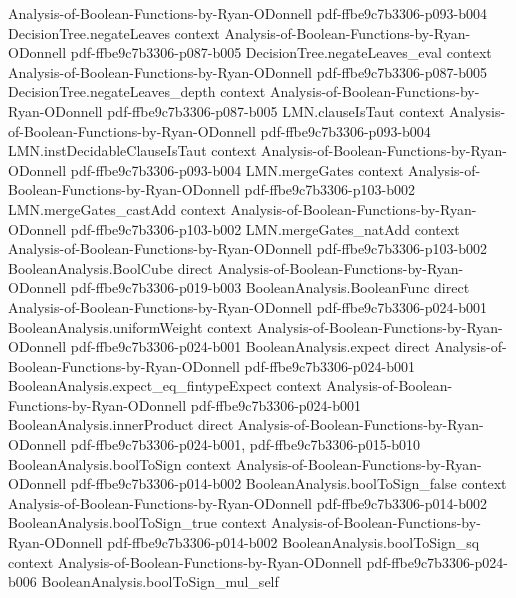 \begin{theorem}
  {Analysis-of-Boolean-Functions-by-Ryan-ODonnell}
  {pdf-ffbe9c7b3306-p093-b004}
\proofstep
  {DecisionTree.negateLeaves}
  {context}
  {Analysis-of-Boolean-Functions-by-Ryan-ODonnell}
  {pdf-ffbe9c7b3306-p087-b005}
\proofstep
  {DecisionTree.negateLeaves_eval}
  {context}
  {Analysis-of-Boolean-Functions-by-Ryan-ODonnell}
  {pdf-ffbe9c7b3306-p087-b005}
\proofstep
  {DecisionTree.negateLeaves_depth}
  {context}
  {Analysis-of-Boolean-Functions-by-Ryan-ODonnell}
  {pdf-ffbe9c7b3306-p087-b005}
\proofstep
  {LMN.clauseIsTaut}
  {context}
  {Analysis-of-Boolean-Functions-by-Ryan-ODonnell}
  {pdf-ffbe9c7b3306-p093-b004}
\proofstep
  {LMN.instDecidableClauseIsTaut}
  {context}
  {Analysis-of-Boolean-Functions-by-Ryan-ODonnell}
  {pdf-ffbe9c7b3306-p093-b004}
\proofstep
  {LMN.mergeGates}
  {context}
  {Analysis-of-Boolean-Functions-by-Ryan-ODonnell}
  {pdf-ffbe9c7b3306-p103-b002}
\proofstep
  {LMN.mergeGates_castAdd}
  {context}
  {Analysis-of-Boolean-Functions-by-Ryan-ODonnell}
  {pdf-ffbe9c7b3306-p103-b002}
\proofstep
  {LMN.mergeGates_natAdd}
  {context}
  {Analysis-of-Boolean-Functions-by-Ryan-ODonnell}
  {pdf-ffbe9c7b3306-p103-b002}
\proofstep
  {BooleanAnalysis.BoolCube}
  {direct}
  {Analysis-of-Boolean-Functions-by-Ryan-ODonnell}
  {pdf-ffbe9c7b3306-p019-b003}
\proofstep
  {BooleanAnalysis.BooleanFunc}
  {direct}
  {Analysis-of-Boolean-Functions-by-Ryan-ODonnell}
  {pdf-ffbe9c7b3306-p024-b001}
\proofstep
  {BooleanAnalysis.uniformWeight}
  {context}
  {Analysis-of-Boolean-Functions-by-Ryan-ODonnell}
  {pdf-ffbe9c7b3306-p024-b001}
\proofstep
  {BooleanAnalysis.expect}
  {direct}
  {Analysis-of-Boolean-Functions-by-Ryan-ODonnell}
  {pdf-ffbe9c7b3306-p024-b001}
\proofstep
  {BooleanAnalysis.expect_eq_fintypeExpect}
  {context}
  {Analysis-of-Boolean-Functions-by-Ryan-ODonnell}
  {pdf-ffbe9c7b3306-p024-b001}
\proofstep
  {BooleanAnalysis.innerProduct}
  {direct}
  {Analysis-of-Boolean-Functions-by-Ryan-ODonnell}
  {pdf-ffbe9c7b3306-p024-b001,
    pdf-ffbe9c7b3306-p015-b010}
\proofstep
  {BooleanAnalysis.boolToSign}
  {context}
  {Analysis-of-Boolean-Functions-by-Ryan-ODonnell}
  {pdf-ffbe9c7b3306-p014-b002}
\proofstep
  {BooleanAnalysis.boolToSign_false}
  {context}
  {Analysis-of-Boolean-Functions-by-Ryan-ODonnell}
  {pdf-ffbe9c7b3306-p014-b002}
\proofstep
  {BooleanAnalysis.boolToSign_true}
  {context}
  {Analysis-of-Boolean-Functions-by-Ryan-ODonnell}
  {pdf-ffbe9c7b3306-p014-b002}
\proofstep
  {BooleanAnalysis.boolToSign_sq}
  {context}
  {Analysis-of-Boolean-Functions-by-Ryan-ODonnell}
  {pdf-ffbe9c7b3306-p024-b006}
\proofstep
  {BooleanAnalysis.boolToSign_mul_self}

\end{theorem}
